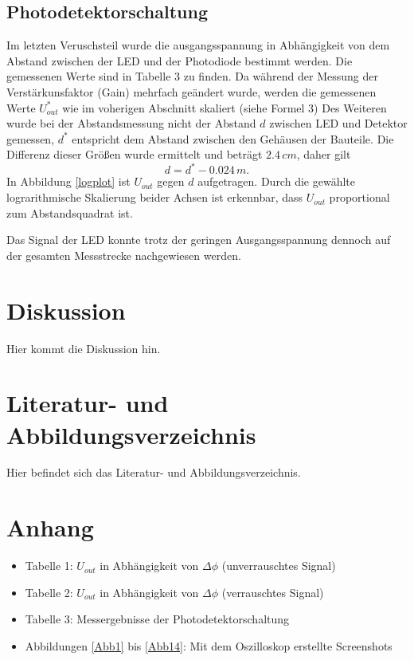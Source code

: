 \documentclass[11pt]{article}
\begin{document}
\subsection{Photodetektorschaltung}
Im letzten Veruschsteil wurde die ausgangsspannung in Abhängigkeit von dem Abstand zwischen der LED und der Photodiode bestimmt werden. Die gemessenen Werte sind  in Tabelle 3 zu finden. Da während der Messung der Verstärkunsfaktor (Gain) mehrfach geändert wurde, werden die gemessenen Werte $U_{out}^*$ wie im voherigen Abschnitt skaliert (siehe Formel 3)
Des Weiteren wurde bei der Abstandsmessung nicht der Abstand $d$ zwischen LED und Detektor gemessen, $d^*$ entspricht dem Abstand zwischen den Gehäusen der Bauteile. Die Differenz dieser Größen wurde ermittelt und beträgt $2.4 \,cm$, daher gilt 
\begin{equation}
d = d^* - 0.024\,m .
\end{equation}
In  Abbildung \ref{logplot} ist $U_{out}$ gegen $d$ aufgetragen. Durch die gewählte lograrithmische Skalierung beider Achsen ist erkennbar, dass $U_{out}$ proportional zum Abstandsquadrat ist.

\noindent
Das Signal der LED konnte trotz der geringen Ausgangsspannung dennoch auf der gesamten Messstrecke nachgewiesen werden. 


\section{Diskussion}
Hier kommt die Diskussion hin.
\section{Literatur- und Abbildungsverzeichnis}
Hier befindet sich das Literatur- und Abbildungsverzeichnis.


\section{Anhang}
\begin{itemize}
\item Tabelle 1: $U_{out}$ in Abhängigkeit von $\Delta\phi$ (unverrauschtes Signal)
\item Tabelle 2: $U_{out}$ in Abhängigkeit von $\Delta\phi$ (verrauschtes Signal)
\item Tabelle 3: Messergebnisse der Photodetektorschaltung
\item Abbildungen \ref{Abb1} bis \ref{Abb14}: Mit dem Oszilloskop erstellte Screenshots
 
\end{itemize}
\newpage
\end{document}
